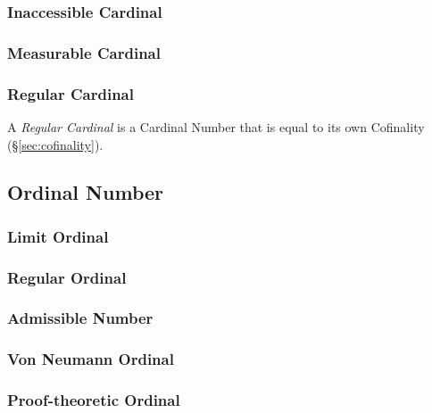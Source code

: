 \subsubsection{Inaccessible Cardinal}\label{sec:inaccessible_cardinal}

\subsubsection{Measurable Cardinal}\label{sec:measurable_cardinal}

\subsubsection{Regular Cardinal}\label{sec:regular_cardinal}

A \emph{Regular Cardinal} is a Cardinal Number that is equal to its
own Cofinality (\S\ref{sec:cofinality}).



\subsection{Ordinal Number}\label{sec:ordinal_number}

\subsubsection{Limit Ordinal}\label{sec:limit_ordinal}

\subsubsection{Regular Ordinal}\label{sec:regular_ordinal}

\subsubsection{Admissible Number}\label{sec:admissible_ordinal}

\subsubsection{Von Neumann Ordinal}\label{sec:vonneumann_ordinal}

\subsubsection{Proof-theoretic Ordinal}\label{sec:proof_ordinal}



